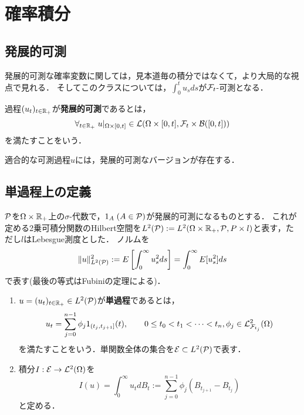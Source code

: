 \documentclass[uplatex,dvipdfmx]{jsreport}
\begin{document}
\section{確率積分}

\subsection{発展的可測}

\begin{tcolorbox}[colframe=ForestGreen, colback=ForestGreen!10!white,breakable,colbacktitle=ForestGreen!40!white,coltitle=black,fonttitle=\bfseries\sffamily,
title=]
    発展的可測な確率変数に関しては，見本道毎の積分ではなくて，より大局的な視点で見れる．
    そしてこのクラスについては，$\int^t_0u_sds$が$\F_t$-可測となる．
\end{tcolorbox}

\begin{definition}
    過程$(u_t)_{t\in\R_+}$が\textbf{発展的可測}であるとは，
    \[\forall_{t\in\R_+}\;u|_{\Om\times[0,t]}\in\L(\Om\times[0,t],\F_t\times\B([0,t]))\]
    を満たすことをいう．
\end{definition}

\begin{lemma}[発展的可測性の十分条件]
    適合的な可測過程$u$には，発展的可測なバージョンが存在する．
\end{lemma}

\subsection{単過程上の定義}

\begin{notation}
    $\P$を$\Om\times\R_+$上の$\sigma$-代数で，$1_A\;(A\in\P)$が発展的可測になるものとする．
    これが定める2乗可積分関数のHilbert空間を$L^2(\P):=L^2(\Om\times\R_+,\P,P\times l)$と表す，ただし$l$はLebesgue測度とした．
    ノルムを
    \[\norm{u}^2_{L^2(\P)}:=E\Square{\int^\infty_{0}u_s^2ds}=\int^\infty_0E[u^2_s]ds\]
    で表す(最後の等式はFubiniの定理による)．
\end{notation}

\begin{definition}\mbox{}
    \begin{enumerate}
        \item 
        $u=(u_t)_{t\in\R_+}\in L^2(\P)$が\textbf{単過程}であるとは，
        \[u_t=\sum_{j=0}^{n-1}\phi_j1_{(t_j,t_{j+1}]}(t),\qquad 0\le t_0<t_1<\cdots<t_n,\phi_j\in\L^2_{\F_{t_j}}(\Om)\]
        を満たすことをいう．単関数全体の集合を$\E\subset L^2(\P)$で表す．
        \item 積分$I:\E\to\L^2(\Om)$を
        \[I(u)=\int^\infty_0 u_tdB_t:=\sum^{n-1}_{j=0}\phi_j(B_{t_{j+1}}-B_{t_j})\]
        と定める．
    \end{enumerate}
\end{definition}
\end{document}
